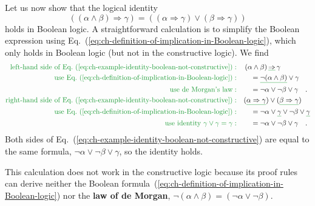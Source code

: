 Let us now show that the logical identity 
\begin{equation}
((\alpha\wedge\beta)\Rightarrow\gamma)=((\alpha\Rightarrow\gamma)\vee(\beta\Rightarrow\gamma))\label{eq:ch-example-identity-boolean-not-constructive}
\end{equation}
holds in Boolean logic. A straightforward calculation is to simplify
the Boolean expression using Eq.~(\ref{eq:ch-definition-of-implication-in-Boolean-logic}),
which only holds in Boolean logic (but not in the constructive logic).
We find
\begin{align*}
{\color{greenunder}\text{left-hand side of Eq.~(\ref{eq:ch-example-identity-boolean-not-constructive})}:}\quad & \left(\alpha\wedge\beta\right)\gunderline{\Rightarrow}\,\gamma\\
{\color{greenunder}\text{use Eq.~(\ref{eq:ch-definition-of-implication-in-Boolean-logic})}:}\quad & \quad=\gunderline{\neg(\alpha\wedge\beta)}\vee\gamma\\
{\color{greenunder}\text{use de Morgan\textsf{'}s law}:}\quad & \quad=\neg\alpha\vee\neg\beta\vee\gamma\quad.\\
{\color{greenunder}\text{right-hand side of Eq.~(\ref{eq:ch-example-identity-boolean-not-constructive})}:}\quad & (\gunderline{\alpha\Rightarrow\gamma})\vee(\gunderline{\beta\Rightarrow\gamma})\\
{\color{greenunder}\text{use Eq.~(\ref{eq:ch-definition-of-implication-in-Boolean-logic})}:}\quad & \quad=\neg\alpha\vee\gunderline{\gamma}\vee\neg\beta\vee\gunderline{\gamma}\\
{\color{greenunder}\text{use identity }\gamma\vee\gamma=\gamma:}\quad & \quad=\neg\alpha\vee\neg\beta\vee\gamma\quad.
\end{align*}
Both sides of Eq.~(\ref{eq:ch-example-identity-boolean-not-constructive})
are equal to the same formula, $\neg\alpha\vee\neg\beta\vee\gamma$,
so the identity holds.

This calculation does not work in the constructive logic because its
proof rules can derive neither the Boolean formula~(\ref{eq:ch-definition-of-implication-in-Boolean-logic})
nor the \textbf{law of de Morgan}, $\neg(\alpha\wedge\beta)=\left(\neg\alpha\vee\neg\beta\right)$.

